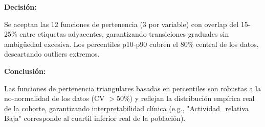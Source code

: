 \documentclass[12pt,letterpaper,twoside]{report}
\begin{document}
\begin{calculobox}
\begin{calculobox}
\begin{table}[H]
\centering
\caption{Parámetros de Funciones de Pertenencia (Percentiles)}
\label{tab:mf_params}
\end{table}
\end{calculobox}

\begin{decisionbox}
\textbf{Decisión:}

Se aceptan las 12 funciones de pertenencia (3 por variable) con overlap del 15-25\% entre etiquetas adyacentes, garantizando transiciones graduales sin ambigüedad excesiva. Los percentiles p10-p90 cubren el 80\% central de los datos, descartando outliers extremos.
\end{decisionbox}

\begin{conclusionbox}
\textbf{Conclusión:}

Las funciones de pertenencia triangulares basadas en percentiles son robustas a la no-normalidad de los datos (CV $> 50\%$) y reflejan la distribución empírica real de la cohorte, garantizando interpretabilidad clínica (e.g., "Actividad\_relativa Baja" corresponde al cuartil inferior real de la población).
\end{conclusionbox}


\end{calculobox}
\end{document}
